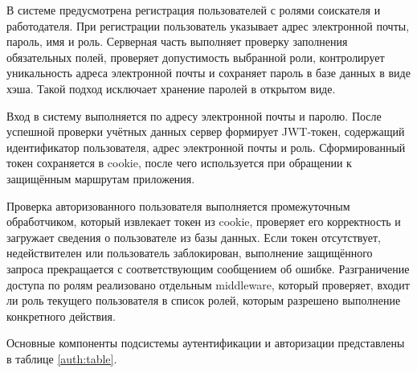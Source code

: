 В системе предусмотрена регистрация пользователей с ролями соискателя и работодателя. При регистрации пользователь указывает адрес электронной почты, пароль, имя и роль. Серверная часть выполняет проверку заполнения обязательных полей, проверяет допустимость выбранной роли, контролирует уникальность адреса электронной почты и сохраняет пароль в базе данных в виде хэша. Такой подход исключает хранение паролей в открытом виде.

Вход в систему выполняется по адресу электронной почты и паролю. После успешной проверки учётных данных сервер формирует JWT-токен, содержащий идентификатор пользователя, адрес электронной почты и роль. Сформированный токен сохраняется в cookie, после чего используется при обращении к защищённым маршрутам приложения.

Проверка авторизованного пользователя выполняется промежуточным обработчиком, который извлекает токен из cookie, проверяет его корректность и загружает сведения о пользователе из базы данных. Если токен отсутствует, недействителен или пользователь заблокирован, выполнение защищённого запроса прекращается с соответствующим сообщением об ошибке. Разграничение доступа по ролям реализовано отдельным middleware, который проверяет, входит ли роль текущего пользователя в список ролей, которым разрешено выполнение конкретного действия.

Основные компоненты подсистемы аутентификации и авторизации представлены в таблице \ref{auth:table}.

